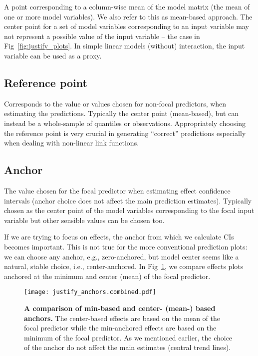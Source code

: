 \documentclass[10pt,letterpaper]{article}
\begin{document}
A point corresponding to a column-wise mean of the model matrix (the mean of one or more model variables). We also refer to this as mean-based approach. The center point for a set of model variables corresponding to an input variable may not represent a possible value of the input variable -- the case in Fig~\ref{fig:justify_plots}. In simple linear models (without) interaction, the input variable can be used as a proxy.

\subsection*{Reference point}

Corresponds to the value or values chosen for non-focal predictors, when estimating the predictions. Typically the center point (mean-based), but can instead be a whole-sample of quantiles or observations. Appropriately choosing the reference point is very crucial in generating ``correct'' predictions especially when dealing with non-linear link functions.


\subsection*{Anchor}

The value chosen for the focal predictor when estimating effect confidence intervals (anchor choice does not affect the main prediction estimates). Typically chosen as the center point of the model variables corresponding to the focal input variable but other sensible values can be chosen too.

If we are trying to focus on effects, the anchor from which we calculate CIs becomes important. This is not true for the more conventional prediction plots: we can choose any anchor, e.g., zero-anchored, but model center seems like a natural, stable choice, i.e., center-anchored. In Fig~\ref{fig:justify_anchors}, we compare effects plots anchored at the minimum and center (mean) of the focal predictor.

\begin{figure}[!h]
\centering
\texttt{[image: justify\_anchors.combined.pdf]}
\caption{{\bf A comparison of min-based and center- (mean-) based anchors.} The center-based effects are based on the mean of the focal predictor while the min-anchored effects are based on the minimum of the focal predictor. As we mentioned earlier, the choice of the anchor do not affect the main estimates (central trend lines).} 
\label{fig:justify_anchors}
\end{figure}
\end{document}
